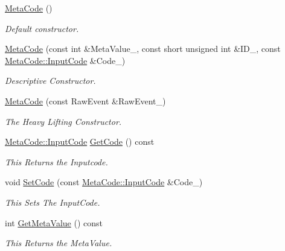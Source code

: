 \begin{DoxyCompactItemize}
\item 
\hyperlink{classMetaCode_a6d4637b2894e5a2d46577c08259a2416}{MetaCode} ()
\begin{DoxyCompactList}\small\item\em Default constructor. \item\end{DoxyCompactList}\item 
\hyperlink{classMetaCode_aaa5c96e46212847295db722a8253e86a}{MetaCode} (const int \&MetaValue\_\-, const short unsigned int \&ID\_\-, const \hyperlink{classMetaCode_a7390e6f58e25c0ce377bba4e63081b24}{MetaCode::InputCode} \&Code\_\-)
\begin{DoxyCompactList}\small\item\em Descriptive Constructor. \item\end{DoxyCompactList}\item 
\hyperlink{classMetaCode_a87b260ce7ee3a66c75320c0fc37cdc0a}{MetaCode} (const RawEvent \&RawEvent\_\-)
\begin{DoxyCompactList}\small\item\em The Heavy Lifting Constructor. \item\end{DoxyCompactList}\item 
\hyperlink{classMetaCode_a7390e6f58e25c0ce377bba4e63081b24}{MetaCode::InputCode} \hyperlink{classMetaCode_a94532fc103d95f3de53eeccbadd6f17b}{GetCode} () const 
\begin{DoxyCompactList}\small\item\em This Returns the Inputcode. \item\end{DoxyCompactList}\item 
void \hyperlink{classMetaCode_a9be5fcad22449c12b649801ab97bbf20}{SetCode} (const \hyperlink{classMetaCode_a7390e6f58e25c0ce377bba4e63081b24}{MetaCode::InputCode} \&Code\_\-)
\begin{DoxyCompactList}\small\item\em This Sets The InputCode. \item\end{DoxyCompactList}\item 
int \hyperlink{classMetaCode_a8d9cd9709ab51323d7061cf7b0ea4ee2}{GetMetaValue} () const 
\begin{DoxyCompactList}\small\item\em This Returns the MetaValue. \item\end{DoxyCompactList}\item 

\end{DoxyCompactItemize}
